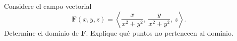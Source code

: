 Considere el campo vectorial
\[
\mathbf{F}(x,y,z)=\left\langle \frac{x}{x^2+y^2},\,\frac{y}{x^2+y^2},\,z\right\rangle.
\]
Determine el dominio de $\mathbf{F}$. Explique qué puntos no pertenecen al dominio.
